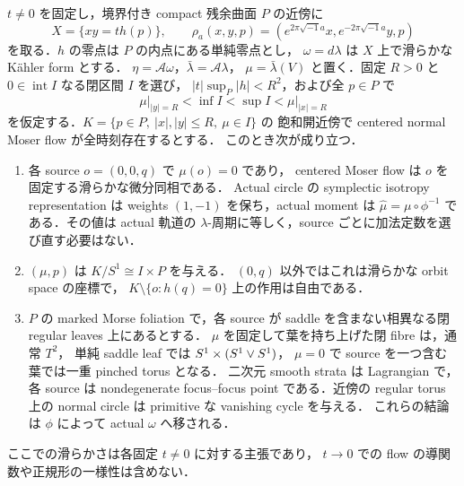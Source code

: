 \begin{lemma}
\label{ke:source-reduction-pinched-fiber}
$t\ne0$ を固定し，境界付き compact 残余曲面 $P$ の近傍に
\[
 X=\{xy=t h(p)\},\qquad
 \rho_a(x,y,p)=(e^{2\pi\sqrt{-1}a}x,e^{-2\pi\sqrt{-1}a}y,p)
\]
を取る．$h$ の零点は $P$ の内点にある単純零点とし，
$\omega=d\lambda$ は $X$ 上で滑らかな K\"ahler form とする．
$\eta=\mathcal A\omega$，$\bar\lambda=\mathcal A\lambda$，
$\mu=\bar\lambda(V)$ と置く．固定 $R>0$ と
$0\in\operatorname{int}I$ なる閉区間 $I$ を選び，
$|t|\sup_P|h|<R^2$，および全 $p\in P$ で
\[
 \left.\mu\right|_{|y|=R}<\inf I<\sup I
       <\left.\mu\right|_{|x|=R}
\]
を仮定する．$K=\{p\in P,\ |x|,|y|\le R,\ \mu\in I\}$ の
飽和開近傍で centered normal Moser flow が全時刻存在するとする．
このとき次が成り立つ．
\begin{enumerate}
 \item 各 source $o=(0,0,q)$ で $\mu(o)=0$ であり，
 centered Moser flow は $o$ を固定する滑らかな微分同相である．
 Actual circle の symplectic isotropy representation は weights $(1,-1)$ を保ち，actual moment は
 $\widehat\mu=\mu\circ\phi^{-1}$ である．その値は actual 軌道の
 $\lambda$-周期に等しく，source ごとに加法定数を選び直す必要はない．
 \item $(\mu,p)$ は $K/S^1\cong I\times P$ を与える．
 $(0,q)$ 以外ではこれは滑らかな orbit space の座標で，
 $K\setminus\{o:h(q)=0\}$ 上の作用は自由である．
 \item $P$ の marked Morse foliation で，各 source が
 saddle を含まない相異なる閉 regular leaves 上にあるとする．
 $\mu$ を固定して葉を持ち上げた閉 fibre は，通常 $T^2$，
 単純 saddle leaf では $S^1\times(S^1\vee S^1)$，
 $\mu=0$ で source を一つ含む葉では一重 pinched torus となる．
 二次元 smooth strata は Lagrangian で，各 source は
 nondegenerate focus--focus point である．近傍の regular torus 上の
 normal circle は primitive な vanishing cycle を与える．
 これらの結論は $\phi$ によって actual $\omega$ へ移される．
\end{enumerate}
ここでの滑らかさは各固定 $t\ne0$ に対する主張であり，
$t\to0$ での flow の導関数や正規形の一様性は含めない．
\end{lemma}
